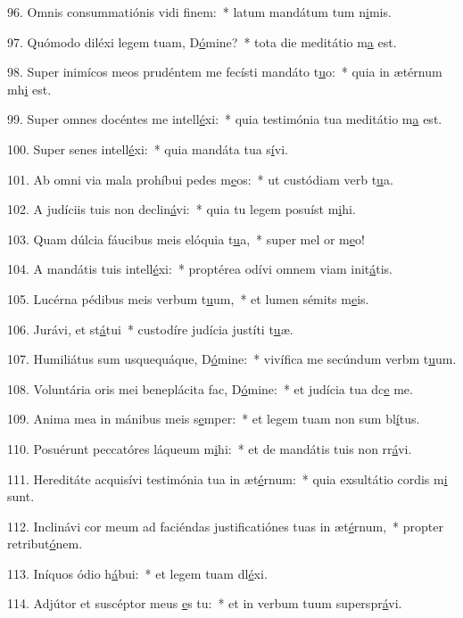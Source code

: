96. Omnis consummatiónis vidi f\uline{i}nem:~* latum mandátum tum n\uline{i}mis.\par 
97. Quómodo diléxi legem tuam, D\uline{ó}mine?~* tota die meditátio m\uline{a} est.\par 
98. Super inimícos meos prudéntem me fecísti mandáto t\uline{u}o:~* quia in ætérnum mh\uline{i} est.\par 
99. Super omnes docéntes me intell\uline{é}xi:~* quia testimónia tua meditátio m\uline{a} est.\par 
100. Super senes intell\uline{é}xi:~* quia mandáta tua s\uline{í}vi.\par 
101. Ab omni via mala prohíbui pedes m\uline{e}os:~* ut custódiam verb t\uline{u}a.\par 
102. A judíciis tuis non declin\uline{á}vi:~* quia tu legem posuíst m\uline{i}hi.\par 
103. Quam dúlcia fáucibus meis elóquia t\uline{u}a,~* super mel or m\uline{e}o!\par 
104. A mandátis tuis intell\uline{é}xi:~* proptérea odívi omnem viam init\uline{á}tis.\par 
105. Lucérna pédibus meis verbum t\uline{u}um,~* et lumen sémits m\uline{e}is.\par 
106. Jurávi, et st\uline{á}tui~* custodíre judícia justíti t\uline{u}æ.\par 
107. Humiliátus sum usquequáque, D\uline{ó}mine:~* vivífica me secúndum verbm t\uline{u}um.\par 
108. Voluntária oris mei beneplácita fac, D\uline{ó}mine:~* et judícia tua dc\uline{e} me.\par 
109. Anima mea in mánibus meis s\uline{e}mper:~* et legem tuam non sum bl\uline{í}tus.\par 
110. Posuérunt peccatóres láqueum m\uline{i}hi:~* et de mandátis tuis non rr\uline{á}vi.\par 
111. Hereditáte acquisívi testimónia tua in æt\uline{é}rnum:~* quia exsultátio cordis m\uline{i} sunt.\par 
112. Inclinávi cor meum ad faciéndas justificatiónes tuas in æt\uline{é}rnum,~* propter retribut\uline{ó}nem.\par 
113. Iníquos ódio h\uline{á}bui:~* et legem tuam dl\uline{é}xi.\par 
114. Adjútor et suscéptor meus \uline{e}s tu:~* et in verbum tuum superspr\uline{á}vi.\par 
